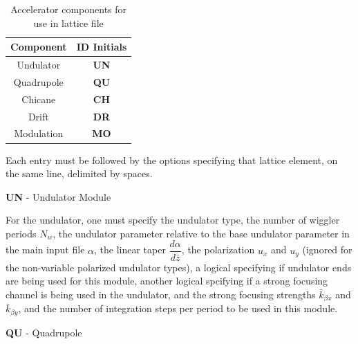 \documentclass[12pt]{article}%
\begin{document}
\begin{table}
\centering
\caption[Input in Lattice File]{Accelerator components for use in lattice file}
\begin{tabular}{|  c   | c  |}
\hline
Component & ID Initials  \\
\hline
Undulator & {\bf UN} \\
\hline
Quadrupole & {\bf QU} \\
\hline
Chicane & {\bf CH} \\
\hline
Drift & {\bf DR} \\
\hline
Modulation & {\bf MO} \\
\hline
\end{tabular}
\label{tableLat}
\vspace*{-\baselineskip}
\end{table}









Each entry must be followed by the options specifying that lattice element, on the same line, delimited by spaces.

{\bf UN} - Undulator Module

For the undulator,  one must specify the undulator type, the number of wiggler periods $N_w$, the undulator parameter relative to the base undulator parameter in the main input file $\alpha$, the linear taper $\dfrac{d \alpha}{d \bar{z}}$, the polarization $u_x$ and $u_y$ (ignored for the non-variable polarized undulator types), a logical specifying if undulator ends are being used for this module, another logical spcifying if a strong focusing channel is being used in the undulator, and the strong focusing strengths $\bar{k}_{\beta x}$ and $\bar{k}_{\beta y}$, and the number of integration steps per period to be used in this module.

{\bf QU} - Quadrupole
\end{document}
